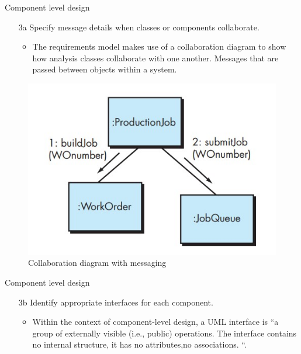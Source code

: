 \documentclass{beamer}
\begin{document}
\begin{frame}{Component level design}
	\begin{itemize}
		\item[3a] Specify message details when classes or components collaborate.
		\begin{itemize}
			\item  The 	requirements model makes use of a collaboration diagram to show how analysis classes
			collaborate with one another. Messages that are passed between objects within a
			system.
		\end{itemize}
	\end{itemize}	

	\begin{figure}
	\includegraphics[scale=.46]{img/m2_49.jpg}
	\caption{Collaboration 
		diagram with 
		messaging}
\end{figure}

\end{frame}




\begin{frame}{Component level design}
	\begin{itemize}
		\item[3b] Identify appropriate interfaces for each component.
		\begin{itemize}
			\item Within the context of 
			component-level design, a UML interface is “a group of externally visible (i.e.,
			public) operations. The interface contains no internal structure, it has no attributes,no 
			associations. “.

		\end{itemize}
	
	\end{itemize}	
\end{frame}
\end{document}
